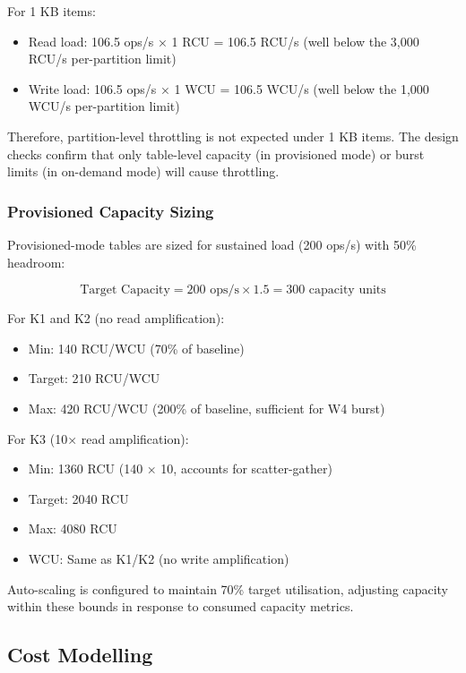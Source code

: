 For 1 KB items:
\begin{itemize}
    \item Read load: 106.5 ops/s × 1 RCU = 106.5 RCU/s (well below the 3,000 RCU/s per-partition limit)
    \item Write load: 106.5 ops/s × 1 WCU = 106.5 WCU/s (well below the 1,000 WCU/s per-partition limit)
\end{itemize}

Therefore, partition-level throttling is not expected under 1 KB items. The design checks confirm that only table-level capacity (in provisioned mode) or burst limits (in on-demand mode) will cause throttling.

\subsubsection{Provisioned Capacity Sizing}

Provisioned-mode tables are sized for sustained load (200 ops/s) with 50\% headroom:

\begin{equation}
\text{Target Capacity} = 200 \text{ ops/s} \times 1.5 = 300 \text{ capacity units}
\end{equation}

For K1 and K2 (no read amplification):
\begin{itemize}
    \item Min: 140 RCU/WCU (70\% of baseline)
    \item Target: 210 RCU/WCU
    \item Max: 420 RCU/WCU (200\% of baseline, sufficient for W4 burst)
\end{itemize}

For K3 (10× read amplification):
\begin{itemize}
    \item Min: 1360 RCU (140 × 10, accounts for scatter-gather)
    \item Target: 2040 RCU
    \item Max: 4080 RCU
    \item WCU: Same as K1/K2 (no write amplification)
\end{itemize}

Auto-scaling is configured to maintain 70\% target utilisation, adjusting capacity within these bounds in response to consumed capacity metrics.

\subsection{Cost Modelling}

